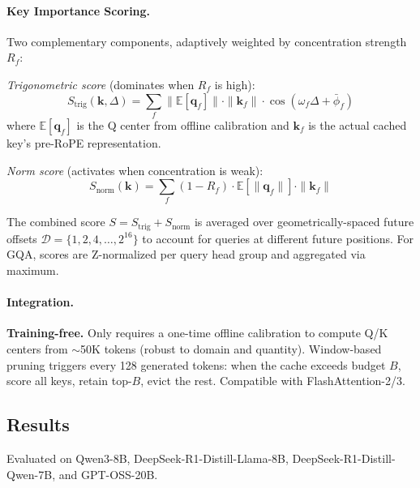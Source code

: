 \documentclass[11pt]{article}
\begin{document}
\paragraph{Key Importance Scoring.}
Two complementary components, adaptively weighted by concentration strength $R_f$:

\textit{Trigonometric score} (dominates when $R_f$ is high):
\begin{equation}
    S_{\mathrm{trig}}(\mathbf{k}, \Delta) = \sum_f \|\mathbb{E}[\mathbf{q}_f]\| \cdot \|\mathbf{k}_f\| \cdot \cos(\omega_f \Delta + \bar{\phi}_f)
\end{equation}
where $\mathbb{E}[\mathbf{q}_f]$ is the Q center from offline calibration and $\mathbf{k}_f$ is the actual cached key's pre-RoPE representation.

\textit{Norm score} (activates when concentration is weak):
\begin{equation}
    S_{\mathrm{norm}}(\mathbf{k}) = \sum_f (1 - R_f) \cdot \mathbb{E}[\|\mathbf{q}_f\|] \cdot \|\mathbf{k}_f\|
\end{equation}

The combined score $S = S_{\mathrm{trig}} + S_{\mathrm{norm}}$ is averaged over geometrically-spaced future offsets $\mathcal{D} = \{1, 2, 4, \ldots, 2^{16}\}$ to account for queries at different future positions. For GQA, scores are Z-normalized per query head group and aggregated via maximum.

\paragraph{Integration.}
\textbf{Training-free.} Only requires a one-time offline calibration to compute Q/K centers from $\sim$50K tokens (robust to domain and quantity). Window-based pruning triggers every 128 generated tokens: when the cache exceeds budget $B$, score all keys, retain top-$B$, evict the rest. Compatible with FlashAttention-2/3.

\subsection{Results}

Evaluated on Qwen3-8B, DeepSeek-R1-Distill-Llama-8B, DeepSeek-R1-Distill-Qwen-7B, and GPT-OSS-20B.
\end{document}
